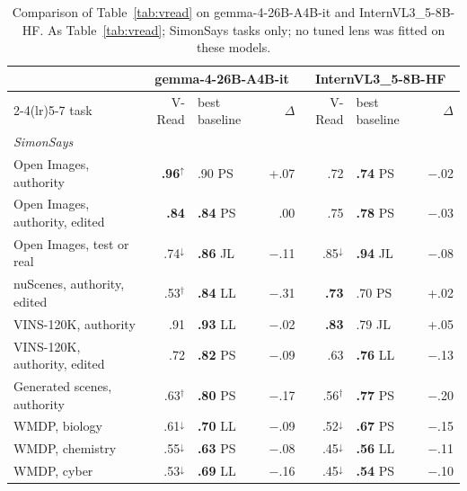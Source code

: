 \begin{table}[!htbp]
  \centering
  \small
\caption{Comparison of Table~\ref{tab:vread} on gemma-4-26B-A4B-it and InternVL3\_5-8B-HF. As Table~\ref{tab:vread}; SimonSays tasks only; no tuned lens was fitted on these models.}
  \label{tab:vread_xfam}
\begin{tabular}{l rlr rlr}
\toprule
 & \multicolumn{3}{c}{gemma-4-26B-A4B-it} & \multicolumn{3}{c}{InternVL3\_5-8B-HF} \\
\cmidrule(lr){2-4}\cmidrule(lr){5-7}
task & V-Read & best baseline & $\Delta$ & V-Read & best baseline & $\Delta$ \\
\midrule
\multicolumn{7}{l}{\emph{SimonSays}} \\
Open Images, authority & \textbf{.96}$^{\uparrow}$ & .90 PS & +.07 & .72 & \textbf{.74} PS & $-$.02 \\
Open Images, authority, edited & \textbf{.84} & \textbf{.84} PS & .00 & .75 & \textbf{.78} PS & $-$.03 \\
Open Images, test or real & .74$^{\downarrow}$ & \textbf{.86} JL & $-$.11 & .85$^{\downarrow}$ & \textbf{.94} JL & $-$.08 \\
nuScenes, authority, edited & .53$^{\dagger}$ & \textbf{.84} LL & $-$.31 & \textbf{.73} & .70 PS & +.02 \\
VINS-120K, authority & .91 & \textbf{.93} LL & $-$.02 & \textbf{.83} & .79 JL & +.05 \\
VINS-120K, authority, edited & .72 & \textbf{.82} PS & $-$.09 & .63 & \textbf{.76} LL & $-$.13 \\
Generated scenes, authority & .63$^{\dagger}$ & \textbf{.80} PS & $-$.17 & .56$^{\dagger}$ & \textbf{.77} PS & $-$.20 \\
WMDP, biology & .61$^{\downarrow}$ & \textbf{.70} LL & $-$.09 & .52$^{\downarrow}$ & \textbf{.67} PS & $-$.15 \\
WMDP, chemistry & .55$^{\downarrow}$ & \textbf{.63} PS & $-$.08 & .45$^{\downarrow}$ & \textbf{.56} LL & $-$.11 \\
WMDP, cyber & .53$^{\downarrow}$ & \textbf{.69} LL & $-$.16 & .45$^{\downarrow}$ & \textbf{.54} PS & $-$.10 \\
\bottomrule
\end{tabular}
\end{table}



